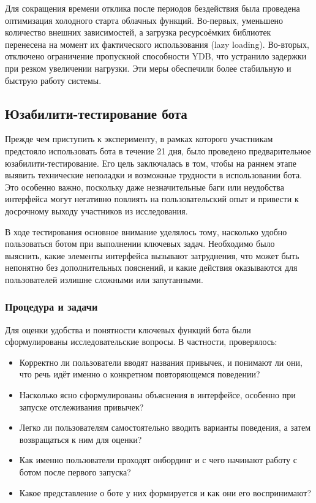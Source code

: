 \documentclass[pdflatex,sn-mathphys-num]{sn-jnl}%
\theoremstyle{thmstyleone}%
\theoremstyle{thmstyletwo}%
\theoremstyle{thmstylethree}%
\begin{document}
Для сокращения времени отклика после периодов бездействия была проведена оптимизация холодного старта облачных функций. Во-первых, уменьшено количество внешних зависимостей, а загрузка ресурсоёмких библиотек перенесена на момент их фактического использования (lazy loading). Во-вторых, отключено ограничение пропускной способности YDB, что устранило задержки при резком увеличении нагрузки. Эти меры обеспечили более стабильную и быструю работу системы.

\subsection{Юзабилити-тестирование бота}

Прежде чем приступить к эксперименту, в рамках которого участникам предстояло использовать бота в течение 21 дня, было проведено предварительное юзабилити-тестирование. Его цель заключалась в том, чтобы на раннем этапе выявить технические неполадки и возможные трудности в использовании бота. Это особенно важно, поскольку даже незначительные баги или неудобства интерфейса могут негативно повлиять на пользовательский опыт и привести к досрочному выходу участников из исследования.

В ходе тестирования основное внимание уделялось тому, насколько удобно пользоваться ботом при выполнении ключевых задач. Необходимо было выяснить, какие элементы интерфейса вызывают затруднения, что может быть непонятно без дополнительных пояснений, и какие действия оказываются для пользователей излишне сложными или запутанными.

\subsubsection{Процедура и задачи}

Для оценки удобства и понятности ключевых функций бота были сформулированы исследовательские вопросы. В частности, проверялось:

\begin{itemize}
    \item Корректно ли пользователи вводят названия привычек, и понимают ли они, что речь идёт именно о конкретном повторяющемся поведении?
    \item Насколько ясно сформулированы объяснения в интерфейсе, особенно при запуске отслеживания привычек?
    \item Легко ли пользователям самостоятельно вводить варианты поведения, а затем возвращаться к ним для оценки?
    \item Как именно пользователи проходят онбординг и с чего начинают работу с ботом после первого запуска?
    \item Какое представление о боте у них формируется и как они его воспринимают?
\end{itemize}
\end{document}
